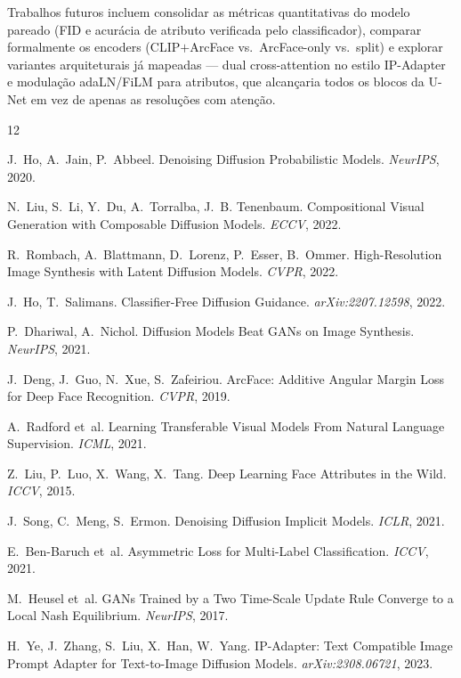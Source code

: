 \documentclass[10pt,twocolumn]{article}
\begin{document}
Trabalhos futuros incluem consolidar as métricas quantitativas do modelo
pareado (FID e acurácia de atributo verificada pelo classificador),
comparar formalmente os encoders (CLIP$+$ArcFace vs.\ ArcFace-only vs.\
split) e explorar variantes arquiteturais já mapeadas --- dual
cross-attention no estilo IP-Adapter~\cite{ye2023} e modulação
adaLN/FiLM para atributos, que alcançaria todos os blocos da U-Net em vez
de apenas as resoluções com atenção.

\begin{thebibliography}{12}
\small

J.~Ho, A.~Jain, P.~Abbeel.
\newblock Denoising Diffusion Probabilistic Models.
\newblock \emph{NeurIPS}, 2020.

N.~Liu, S.~Li, Y.~Du, A.~Torralba, J.~B. Tenenbaum.
\newblock Compositional Visual Generation with Composable Diffusion Models.
\newblock \emph{ECCV}, 2022.

R.~Rombach, A.~Blattmann, D.~Lorenz, P.~Esser, B.~Ommer.
\newblock High-Resolution Image Synthesis with Latent Diffusion Models.
\newblock \emph{CVPR}, 2022.

J.~Ho, T.~Salimans.
\newblock Classifier-Free Diffusion Guidance.
\newblock \emph{arXiv:2207.12598}, 2022.

P.~Dhariwal, A.~Nichol.
\newblock Diffusion Models Beat GANs on Image Synthesis.
\newblock \emph{NeurIPS}, 2021.

J.~Deng, J.~Guo, N.~Xue, S.~Zafeiriou.
\newblock ArcFace: Additive Angular Margin Loss for Deep Face Recognition.
\newblock \emph{CVPR}, 2019.

A.~Radford et~al.
\newblock Learning Transferable Visual Models From Natural Language
  Supervision.
\newblock \emph{ICML}, 2021.

Z.~Liu, P.~Luo, X.~Wang, X.~Tang.
\newblock Deep Learning Face Attributes in the Wild.
\newblock \emph{ICCV}, 2015.

J.~Song, C.~Meng, S.~Ermon.
\newblock Denoising Diffusion Implicit Models.
\newblock \emph{ICLR}, 2021.

E.~Ben-Baruch et~al.
\newblock Asymmetric Loss for Multi-Label Classification.
\newblock \emph{ICCV}, 2021.

M.~Heusel et~al.
\newblock GANs Trained by a Two Time-Scale Update Rule Converge to a Local
  Nash Equilibrium.
\newblock \emph{NeurIPS}, 2017.

H.~Ye, J.~Zhang, S.~Liu, X.~Han, W.~Yang.
\newblock IP-Adapter: Text Compatible Image Prompt Adapter for
  Text-to-Image Diffusion Models.
\newblock \emph{arXiv:2308.06721}, 2023.

\end{thebibliography}
\end{document}
